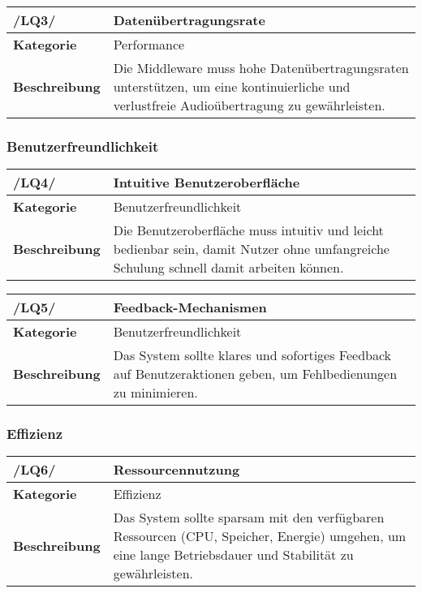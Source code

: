 \begin{table}[h!]
	\begin{tabularx}{\textwidth}{|l|X|}
		\hline
		\textbf{/LQ3/} & \textbf{Datenübertragungsrate} \\ \hline
		\textbf{Kategorie} & Performance \\ \hline
		\textbf{Beschreibung} & Die Middleware muss hohe Datenübertragungsraten unterstützen, um eine kontinuierliche und verlustfreie Audioübertragung zu gewährleisten. \\ \hline
	\end{tabularx}
\end{table}

\subsubsection{Benutzerfreundlichkeit}

\begin{table}[h!]
	\begin{tabularx}{\textwidth}{|l|X|}
		\hline
		\textbf{/LQ4/} & \textbf{Intuitive Benutzeroberfläche} \\ \hline
		\textbf{Kategorie} & Benutzerfreundlichkeit \\ \hline
		\textbf{Beschreibung} & Die Benutzeroberfläche muss intuitiv und leicht bedienbar sein, damit Nutzer ohne umfangreiche Schulung schnell damit arbeiten können. \\ \hline
	\end{tabularx}
\end{table}

\begin{table}[h!]
	\begin{tabularx}{\textwidth}{|l|X|}
		\hline
		\textbf{/LQ5/} & \textbf{Feedback-Mechanismen} \\ \hline
		\textbf{Kategorie} & Benutzerfreundlichkeit \\ \hline
		\textbf{Beschreibung} & Das System sollte klares und sofortiges Feedback auf Benutzeraktionen geben, um Fehlbedienungen zu minimieren. \\ \hline
	\end{tabularx}
\end{table}

\newpage
\subsubsection{Effizienz}

\begin{table}[h!]
	\begin{tabularx}{\textwidth}{|l|X|}
		\hline
		\textbf{/LQ6/} & \textbf{Ressourcennutzung} \\ \hline
		\textbf{Kategorie} & Effizienz \\ \hline
		\textbf{Beschreibung} & Das System sollte sparsam mit den verfügbaren Ressourcen (CPU, Speicher, Energie) umgehen, um eine lange Betriebsdauer und Stabilität zu gewährleisten. \\ \hline
	\end{tabularx}
\end{table}

